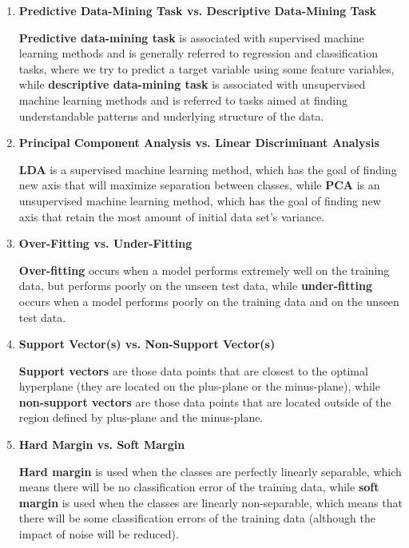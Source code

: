 \documentclass{homework}
\begin{document}
    \begin{enumerate}
        \item \textbf{Predictive Data-Mining Task vs. Descriptive Data-Mining Task}
        
        \textbf{Predictive data-mining task} is associated with supervised machine learning methods and is generally referred to regression and classification tasks, where we try to predict a target variable using some feature variables, while \textbf{descriptive data-mining task} is associated with unsupervised machine learning methods and is referred to tasks aimed at finding understandable patterns and underlying structure of the data.
        
        \item \textbf{Principal Component Analysis vs. Linear Discriminant Analysis}
        
        \textbf{LDA} is a supervised machine learning method, which has the goal of finding new axis that will maximize separation between classes, while \textbf{PCA} is an unsupervised machine learning method, which has the goal of finding new axis that retain the most amount of initial data set's variance. 
        
        \item \textbf{Over-Fitting vs. Under-Fitting}
        
        \textbf{Over-fitting} occurs when a model performs extremely well on the training data, but performs poorly on the unseen test data, while \textbf{under-fitting} occurs when a model performs poorly on the training data and on the unseen test data. 
        
        \item \textbf{Support Vector(s) vs. Non-Support Vector(s)}
        
        \textbf{Support vectors} are those data points that are closest to the optimal hyperplane (they are located on the plus-plane or the minus-plane),  while \textbf{non-support vectors} are those data points that are located outside of the region defined by plus-plane and the minus-plane.
        
        \item \textbf{Hard Margin vs. Soft Margin}
        
        \textbf{Hard margin} is used when the classes are perfectly linearly separable, which means there will be no classification error of the training data, while \textbf{soft margin} is used when the classes are linearly non-separable, which means that there will be some classification errors of the training data (although the impact of noise will be reduced). 
        

\end{enumerate}
\end{document}

